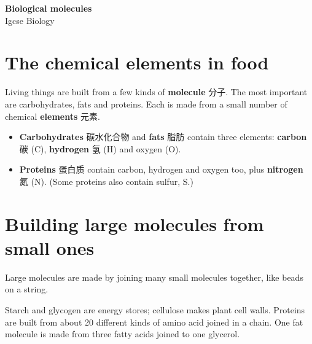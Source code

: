 \documentclass[11pt]{article}
\begin{document}
\begin{center}
  {\LARGE\bfseries Biological molecules}\\[0.35em]
  {\large Igcse Biology}
\end{center}
\vspace{0.6em}

\section*{The chemical elements in food}

Living things are built from a few kinds of \textbf{molecule} 分子. The most important are carbohydrates, fats and proteins. Each is made from a small number of chemical \textbf{elements} 元素.

\begin{itemize}
\item \textbf{Carbohydrates} 碳水化合物 and \textbf{fats} 脂肪 contain three elements: \textbf{carbon} 碳 (C), \textbf{hydrogen} 氢 (H) and oxygen (O).

\item \textbf{Proteins} 蛋白质 contain carbon, hydrogen and oxygen too, plus \textbf{nitrogen} 氮 (N). (Some proteins also contain sulfur, S.)

\end{itemize}

\section*{Building large molecules from small ones}

Large molecules are made by joining many small molecules together, like beads on a string.

\begin{center}
\end{center}

Starch and glycogen are energy stores; cellulose makes plant cell walls. Proteins are built from about 20 different kinds of amino acid joined in a chain. One fat molecule is made from three fatty acids joined to one glycerol.
\end{document}
